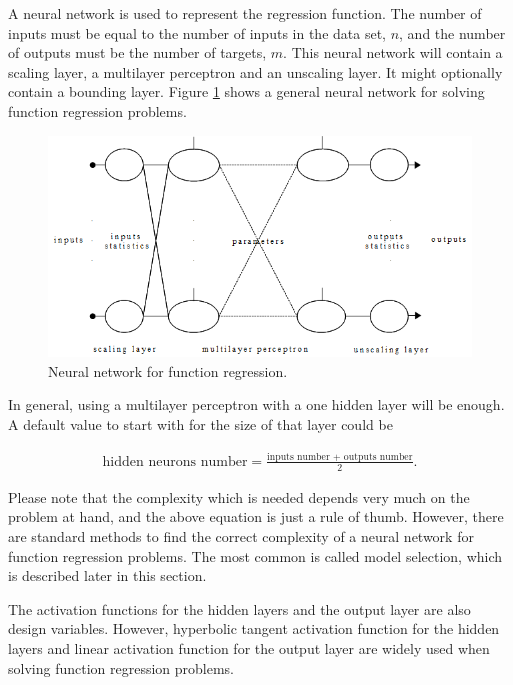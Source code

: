 A neural network is used to represent the regression function. 
The number of inputs must be equal to the number of inputs in the data set, $n$, and the number of outputs must be the number of targets, $m$. 
This neural network will contain a scaling layer, a multilayer perceptron and an unscaling layer. 
It might optionally contain a bounding layer. 
Figure \ref{NeuralNetworkFunctionRegressionFigure} shows a general neural network for solving function regression problems. 

\begin{figure}[h!]
\begin{center}
\includegraphics[width=1.2\textwidth]{function_regression/neural_network_function_regression.png}
\caption{Neural network for function regression.}\label{NeuralNetworkFunctionRegressionFigure}
\end{center}
\end{figure}

In general, using a multilayer perceptron with a one hidden layer will be enough. 
A default value to start with for the size of that layer could be 

\begin{eqnarray}\nonumber
\text{hidden neurons number}=\frac{\text{inputs number + outputs number}}{2}. 
\end{eqnarray}

Please note that the complexity which is needed depends very much on the problem at hand, and the above equation is just a rule of thumb. 
However, there are standard methods to find the correct complexity of a neural network for function regression problems. 
The most common is called model selection, which is described later in this section.  

The activation functions for the hidden layers and the output layer are also design variables. 
However, hyperbolic tangent activation function for the hidden layers and linear activation function for the output layer are widely used when solving function regression problems. 

